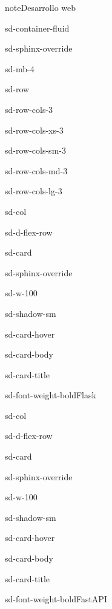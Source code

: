 \documentclass[letterpaper,10pt,spanish]{sphinxmanual}
\begin{document}
\begin{sphinxadmonition}{note}{Desarrollo web}
\begin{sphinxuseclass}{sd-container-fluid}
\begin{sphinxuseclass}{sd-sphinx-override}
\begin{sphinxuseclass}{sd-mb-4}
\begin{sphinxuseclass}{sd-row}
\begin{sphinxuseclass}{sd-row-cols-3}
\begin{sphinxuseclass}{sd-row-cols-xs-3}
\begin{sphinxuseclass}{sd-row-cols-sm-3}
\begin{sphinxuseclass}{sd-row-cols-md-3}
\begin{sphinxuseclass}{sd-row-cols-lg-3}
\begin{sphinxuseclass}{sd-col}
\begin{sphinxuseclass}{sd-d-flex-row}
\begin{sphinxuseclass}{sd-card}
\begin{sphinxuseclass}{sd-sphinx-override}
\begin{sphinxuseclass}{sd-w-100}
\begin{sphinxuseclass}{sd-shadow-sm}
\begin{sphinxuseclass}{sd-card-hover}
\begin{sphinxuseclass}{sd-card-body}
\begin{sphinxuseclass}{sd-card-title}
\begin{sphinxuseclass}{sd-font-weight-bold}Flask
\end{sphinxuseclass}
\end{sphinxuseclass}
\end{sphinxuseclass}
\noindent{}
\end{sphinxuseclass}
\end{sphinxuseclass}
\end{sphinxuseclass}
\end{sphinxuseclass}
\end{sphinxuseclass}
\end{sphinxuseclass}
\end{sphinxuseclass}
\begin{sphinxuseclass}{sd-col}
\begin{sphinxuseclass}{sd-d-flex-row}
\begin{sphinxuseclass}{sd-card}
\begin{sphinxuseclass}{sd-sphinx-override}
\begin{sphinxuseclass}{sd-w-100}
\begin{sphinxuseclass}{sd-shadow-sm}
\begin{sphinxuseclass}{sd-card-hover}
\begin{sphinxuseclass}{sd-card-body}
\begin{sphinxuseclass}{sd-card-title}
\begin{sphinxuseclass}{sd-font-weight-bold}FastAPI
\end{sphinxuseclass}
\end{sphinxuseclass}
\end{sphinxuseclass}
\noindent{}
\end{sphinxuseclass}
\end{sphinxuseclass}
\end{sphinxuseclass}
\end{sphinxuseclass}
\end{sphinxuseclass}
\end{sphinxuseclass}

\end{sphinxuseclass}
\end{sphinxuseclass}
\end{sphinxuseclass}
\end{sphinxuseclass}
\end{sphinxuseclass}
\end{sphinxuseclass}
\end{sphinxuseclass}
\end{sphinxuseclass}
\end{sphinxuseclass}
\end{sphinxuseclass}
\end{sphinxadmonition}
\end{document}
